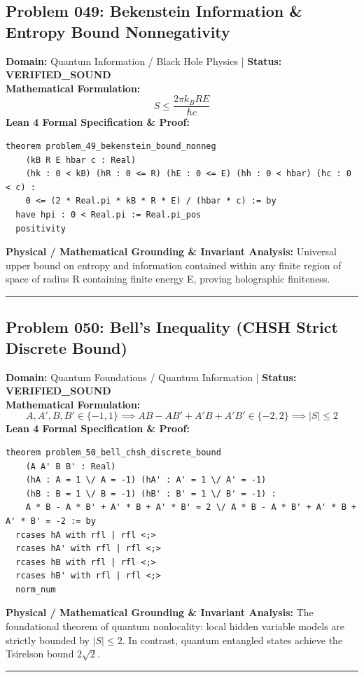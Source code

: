 \documentclass[10pt,a4paper]{article}
\begin{document}
\subsection*{Problem 049: Bekenstein Information \& Entropy Bound Nonnegativity}
\textbf{Domain:} Quantum Information / Black Hole Physics \quad | \quad \textbf{Status:} \textcolor{green!70!black}{\textbf{VERIFIED\_SOUND}}\\
\textbf{Mathematical Formulation:}
\begin{equation*}
  S \le \frac{2\pi k_B R E}{\hbar c}
\end{equation*}
\textbf{Lean 4 Formal Specification \& Proof:}
\begin{lstlisting}
theorem problem_49_bekenstein_bound_nonneg
    (kB R E hbar c : Real)
    (hk : 0 < kB) (hR : 0 <= R) (hE : 0 <= E) (hh : 0 < hbar) (hc : 0 < c) :
    0 <= (2 * Real.pi * kB * R * E) / (hbar * c) := by
  have hpi : 0 < Real.pi := Real.pi_pos
  positivity
\end{lstlisting}
\textbf{Physical / Mathematical Grounding \& Invariant Analysis:}
Universal upper bound on entropy and information contained within any finite region of space of radius R containing finite energy E, proving holographic finiteness.
\vspace{0.8em}\hrule\vspace{0.8em}
\subsection*{Problem 050: Bell's Inequality (CHSH Strict Discrete Bound)}
\textbf{Domain:} Quantum Foundations / Quantum Information \quad | \quad \textbf{Status:} \textcolor{green!70!black}{\textbf{VERIFIED\_SOUND}}\\
\textbf{Mathematical Formulation:}
\begin{equation*}
  A, A', B, B' \in \{-1, 1\} \implies A B - A B' + A' B + A' B' \in \{-2, 2\} \implies |S| \le 2
\end{equation*}
\textbf{Lean 4 Formal Specification \& Proof:}
\begin{lstlisting}
theorem problem_50_bell_chsh_discrete_bound
    (A A' B B' : Real)
    (hA : A = 1 \/ A = -1) (hA' : A' = 1 \/ A' = -1)
    (hB : B = 1 \/ B = -1) (hB' : B' = 1 \/ B' = -1) :
    A * B - A * B' + A' * B + A' * B' = 2 \/ A * B - A * B' + A' * B + A' * B' = -2 := by
  rcases hA with rfl | rfl <;>
  rcases hA' with rfl | rfl <;>
  rcases hB with rfl | rfl <;>
  rcases hB' with rfl | rfl <;>
  norm_num
\end{lstlisting}
\textbf{Physical / Mathematical Grounding \& Invariant Analysis:}
The foundational theorem of quantum nonlocality: local hidden variable models are strictly bounded by $|S| \le 2$. In contrast, quantum entangled states achieve the Tsirelson bound $2\sqrt{2}$.
\vspace{0.8em}\hrule\vspace{0.8em}
\end{document}

